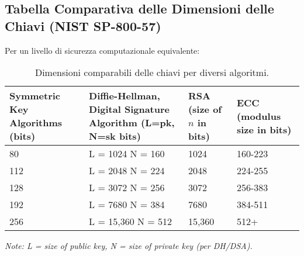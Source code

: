 \subsection{Tabella Comparativa delle Dimensioni delle Chiavi (NIST SP-800-57)}
Per un livello di sicurezza computazionale equivalente:
\begin{table}[H]
    \centering
    \renewcommand{\arraystretch}{1.2} %
    \begin{tabular}{|p{2.5cm}|p{3.5cm}|p{2.5cm}|p{2.5cm}|}
        \hline
        \rowcolor{bg_custom}
        \textbf{\sffamily Symmetric Key Algorithms (bits)} & \textbf{\sffamily Diffie-Hellman, Digital Signature Algorithm (L=pk, N=sk bits)} & \textbf{\sffamily RSA (size of $n$ in bits)} & \textbf{\sffamily ECC (modulus size in bits)} \\ \hline \hline
        80  & L = 1024 \newline N = 160 & 1024  & 160-223 \\ \hline
        112 & L = 2048 \newline N = 224 & 2048  & 224-255 \\ \hline
        128 & L = 3072 \newline N = 256 & 3072  & 256-383 \\ \hline
        192 & L = 7680 \newline N = 384 & 7680  & 384-511 \\ \hline
        256 & L = 15,360 \newline N = 512 & 15,360 & 512+    \\ \hline
    \end{tabular}
    \caption{Dimensioni comparabili delle chiavi per diversi algoritmi.}
    \label{tab:key_sizes_comparison}
    \small\textit{Note: L = size of public key, N = size of private key (per DH/DSA).}
\end{table}

